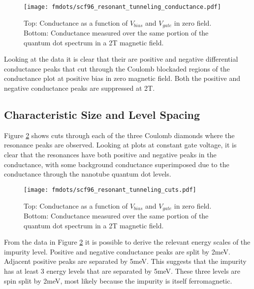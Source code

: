 \begin{figure}
    \centering
    \texttt{[image: fmdots/scf96\_resonant\_tunneling\_conductance.pdf]}
    \caption{Top: Conductance as a function of $V_{bias}$ and $V_{gate}$ in zero field. Bottom: Conductance measured over the same portion of the quantum dot spectrum in a 2T magnetic field.}
    \label{fig:resonant_tunneling}
\end{figure}

Looking at the data it is clear that their are positive and negative differential conductance peaks that cut through the Coulomb blockaded regions of the conductance plot at positive bias in zero magnetic field. Both the positive and negative conductance peaks are suppressed at 2T.

\subsection{Characteristic Size and Level Spacing}

Figure \ref{fig:resonance_cuts} shows cuts through each of the three Coulomb diamonds where the resonance peaks are observed. Looking at plots at constant gate voltage, it is clear that the resonances have both positive and negative peaks in the conductance, with some background conductance superimposed due to the conductance through the nanotube quantum dot levels.

\begin{figure}
    \centering
    \texttt{[image: fmdots/scf96\_resonant\_tunneling\_cuts.pdf]}
    \caption{Top: Conductance as a function of $V_{bias}$ and $V_{gate}$ in zero field. Bottom: Conductance measured over the same portion of the quantum dot spectrum in a 2T magnetic field.}
    \label{fig:resonance_cuts}
\end{figure}

From the data in Figure \ref{fig:resonance_cuts} it is possible to derive the relevant energy scales of the impurity level. Positive and negative conductance peaks are split by 2meV. Adjacent positive peaks are separated by 5meV. This suggests that the impurity has at least 3 energy levels that are separated by 5meV. These three levels are spin split by 2meV, most likely because the impurity is itself ferromagnetic.


